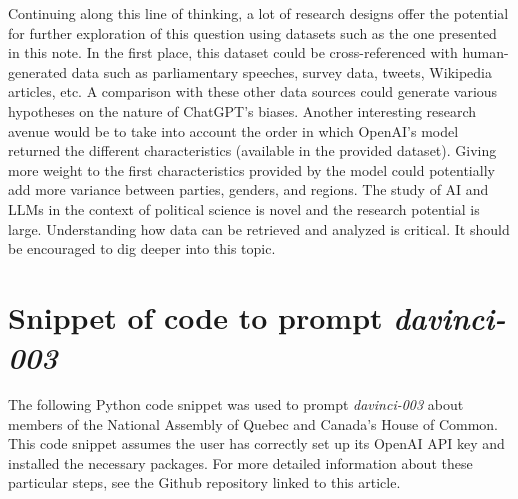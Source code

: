 \documentclass{article}
\begin{document}
Continuing along this line of thinking, a lot of research designs offer the potential for further exploration of this question using datasets such as the one presented in this note. In the first place, this dataset could be cross-referenced with human-generated data such as parliamentary speeches, survey data, tweets, Wikipedia articles, etc. A comparison with these other data sources could generate various hypotheses on the nature of ChatGPT's biases. Another interesting research avenue would be to take into account the order in which OpenAI's model returned the different characteristics (available in the provided dataset). Giving more weight to the first characteristics provided by the model could potentially add more variance between parties, genders, and regions. The study of AI and LLMs in the context of political science is novel and the research potential is large. Understanding how data can be retrieved and analyzed is critical. It should be encouraged to dig deeper into this topic.

\newpage
\printbibliography


\appendix

\newpage
\section{Snippet of code to prompt \textit{davinci-003}}
\label{appendix:codesnippet}

The following Python code snippet was used to prompt \textit{davinci-003} about members of the National Assembly of Quebec and Canada's House of Common. This code snippet assumes the user has correctly set up its OpenAI API key and installed the necessary packages. For more detailed information about these particular steps, see the Github repository linked to this article.
\end{document}

